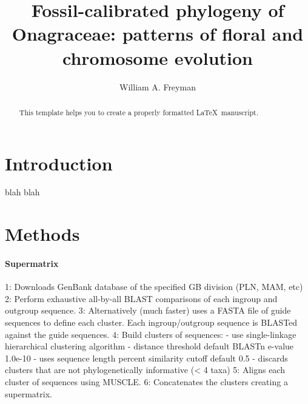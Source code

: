 \documentclass[review]{elsarticle}
\begin{document}
\begin{frontmatter}

\title{Fossil-calibrated phylogeny of Onagraceae: patterns of floral and chromosome evolution}

\author[berk]{William A. Freyman}

\address[berk]{Jepson Herbarium and Department of Integrative Biology, University of California, Berkeley}

\begin{abstract}
This template helps you to create a properly formatted \LaTeX\ manuscript.
\end{abstract}


\end{frontmatter}

\linenumbers

\section{Introduction}

blah blah

\section{Methods}

\paragraph{Supermatrix} 

1: Downloads GenBank database of the specified GB division (PLN, MAM, etc)
2: Perform exhaustive all-by-all BLAST comparisons of each ingroup and outgroup sequence.
3: Alternatively (much faster) uses a FASTA file of guide sequences to define each cluster.
   Each ingroup/outgroup sequence is BLASTed against the guide sequences.
   4: Build clusters of sequences:
           - use single-linkage hierarchical clustering algorithm
	           - distance threshold default BLASTn e-value 1.0e-10
		           - uses sequence length percent similarity cutoff default 0.5
			           - discards clusters that are not phylogenetically informative (< 4 taxa)
				   5: Aligns each cluster of sequences using MUSCLE.
				   6: Concatenates the clusters creating a supermatrix.
\end{document}
